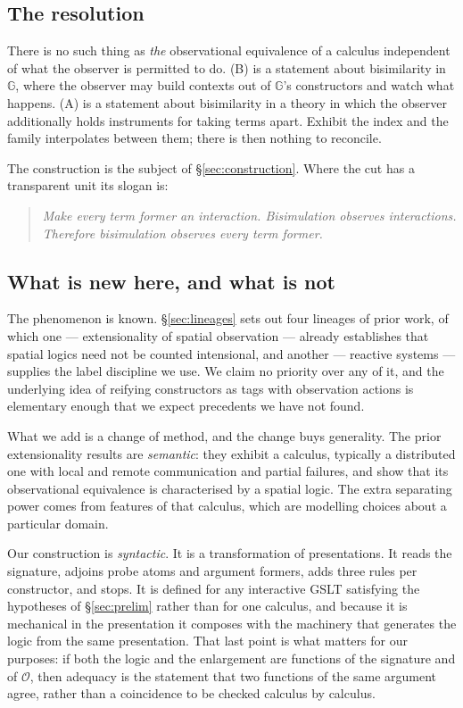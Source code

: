 \documentclass[11pt]{article}
\theoremstyle{plain}
\theoremstyle{definition}
\newcommand{\Gg}{\mathbb{G}}
\newcommand{\Ob}{\mathcal{O}}
\begin{document}
\subsection{The resolution}

There is no such thing as \emph{the} observational equivalence of a calculus independent of what the
observer is permitted to do. (B) is a statement about bisimilarity in $\Gg$, where the observer may
build contexts out of $\Gg$'s constructors and watch what happens. (A) is a statement about
bisimilarity in a theory in which the observer additionally holds instruments for taking terms apart.
Exhibit the index and the family interpolates between them; there is then nothing to reconcile.

The construction is the subject of \S\ref{sec:construction}. Where the cut has a transparent unit its
slogan is:

\begin{quote}
\itshape Make every term former an interaction. Bisimulation observes interactions. Therefore
bisimulation observes every term former.
\end{quote}

\subsection{What is new here, and what is not}
\label{sec:contribution}

The phenomenon is known. \S\ref{sec:lineages} sets out four lineages of prior work, of which one ---
extensionality of spatial observation --- already establishes that spatial logics need not be counted
intensional, and another --- reactive systems --- supplies the label discipline we use. We claim no
priority over any of it, and the underlying idea of reifying constructors as tags with observation
actions is elementary enough that we expect precedents we have not found.

What we add is a change of method, and the change buys generality. The prior extensionality results are
\emph{semantic}: they exhibit a calculus, typically a distributed one with local and remote
communication and partial failures, and show that its observational equivalence is characterised by a
spatial logic. The extra separating power comes from features of that calculus, which are modelling
choices about a particular domain.

Our construction is \emph{syntactic}. It is a transformation of presentations. It reads the signature,
adjoins probe atoms and argument formers, adds three rules per constructor, and stops. It is defined
for any interactive GSLT satisfying the hypotheses of \S\ref{sec:prelim} rather than for one calculus,
and because it is mechanical in the presentation it composes with the machinery that generates the
logic from the same presentation. That last point is what matters for our purposes: if both the logic
and the enlargement are functions of the signature and of $\Ob$, then adequacy is the statement that
two functions of the same argument agree, rather than a coincidence to be checked calculus by calculus.
\end{document}
